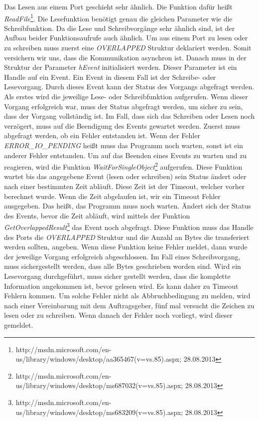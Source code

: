 Das Lesen aus einem Port geschieht sehr ähnlich. Die Funktion dafür heißt \textit{ReadFile}\footnote{http://msdn.microsoft.com/en-us/library/windows/desktop/aa365467(v=vs.85).aspx; 28.08.2013}. Die Lesefunktion benötigt genau die gleichen Parameter wie die Schreibfunktion. Da die Lese und Schreibvorgänge sehr ähnlich sind, ist der Aufbau beider Funktionsaufrufe auch ähnlich. Um aus einem Port zu lesen oder zu schreiben muss zuerst eine \textit{OVERLAPPED} Struktur deklariert werden. Somit versichern wir uns, dass die Kommunikation asynchron ist. Danach muss in der Struktur der Parameter \textit{hEvent} initialisiert werden. Dieser Parameter ist ein Handle auf ein Event. Ein Event in diesem Fall ist der Schreibe- oder Lesevorgang. Durch dieses Event kann der Status des Vorgangs abgefragt werden. Als erstes wird die jeweilige Lese- oder Schreibfunktion aufgerufen. Wenn dieser Vorgang erfolgreich war, muss der Status abgefragt werden, um sicher zu sein, dass der Vorgang vollständig ist. Im Fall, dass sich das Schreiben oder Lesen noch verzögert, muss auf die Beendigung des Events gewartet werden. Zuerst muss abgefragt werden, ob ein Fehler entstanden ist. Wenn der Fehler \textit{ERROR\_IO\_PENDING} heißt muss das Programm noch warten, sonst ist ein anderer Fehler entstanden. Um auf das Beenden eines Events zu warten und zu reagieren, wird die Funktion \textit{WaitForSingleObject}\footnote{http://msdn.microsoft.com/en-us/library/windows/desktop/ms687032(v=vs.85).aspx; 28.08.2013} aufgerufen. Diese Funktion wartet bis das angegebene Event (lesen oder schreiben) sein Status ändert oder nach einer bestimmten Zeit abläuft. Diese Zeit ist der Timeout, welcher vorher berechnet wurde. Wenn die Zeit abgelaufen ist, wir ein Timeout Fehler ausgegeben. Das heißt, das Programm muss noch warten. Ändert sich der Status des Events, bevor die Zeit abläuft, wird mittels der Funktion \textit{GetOverlappedResult}\footnote{http://msdn.microsoft.com/en-us/library/windows/desktop/ms683209(v=vs.85).aspx; 28.08.2013} das Event noch abgefragt. Diese Funktion muss das Handle des Ports die \textit{OVERLAPPED} Struktur und die Anzahl an Bytes die transferiert werden sollten, angeben. Wenn diese Funktion keine Fehler meldet, dann wurde der jeweilige Vorgang erfolgreich abgeschlossen. Im Fall eines Schreibvorgang, muss sichergestellt werden, dass alle Bytes geschrieben worden sind. Wird ein Lesevorgang durchgeführt, muss sicher gestellt werden, dass die komplette Information angekommen ist, bevor gelesen wird. Es kann daher zu Timeout Fehlern kommen. Um solche Fehler nicht als Abbruchbedingung zu melden, wird nach einer Vereinbarung mit dem Auftragsgeber, fünf mal versucht die Zeichen zu lesen oder zu schreiben. Wenn danach der Fehler noch vorliegt, wird dieser gemeldet.